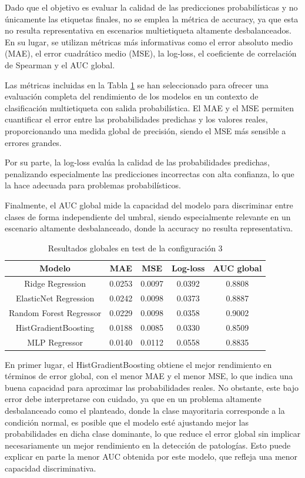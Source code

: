 \documentclass[12pt,a4paper,twoside]{book}
\begin{document}
Dado que el objetivo es evaluar la calidad de las predicciones probabilísticas y no únicamente las etiquetas finales, no se emplea la métrica de accuracy, ya que esta no resulta representativa en escenarios multietiqueta altamente desbalanceados.
En su lugar, se utilizan métricas más informativas como el error absoluto medio (MAE), el error cuadrático medio (MSE), la log-loss, el coeficiente de correlación de Spearman y el AUC global.

Las métricas incluidas en la Tabla \ref{tab:analisis-global-config3} se han seleccionado para ofrecer una evaluación completa del rendimiento de los modelos en un contexto de clasificación multietiqueta con salida probabilística. 
El MAE y el MSE permiten cuantificar el error entre las probabilidades predichas y los valores reales, proporcionando una medida global de precisión, siendo el MSE más sensible a errores grandes.

Por su parte, la log-loss evalúa la calidad de las probabilidades predichas, penalizando especialmente las predicciones incorrectas con alta confianza, lo que la hace adecuada para problemas probabilísticos.

Finalmente, el AUC global mide la capacidad del modelo para discriminar entre clases de forma independiente del umbral, siendo especialmente relevante en un escenario altamente desbalanceado, donde la accuracy no resulta representativa.

\begin{table}[H]
	\centering
	\begin{tabular}{|c|c|c|c|c|}
	\hline
	\textbf{Modelo} & \textbf{MAE} & \textbf{MSE} & \textbf{Log-loss} & \textbf{AUC global} \\
	\hline
	Ridge Regression            & 0.0253 & 0.0097 & 0.0392 & 0.8808 \\
	ElasticNet Regression       & 0.0242 & 0.0098 & 0.0373 & 0.8887 \\
	Random Forest Regressor     & 0.0229 & 0.0098 & 0.0358 & 0.9002 \\
	HistGradientBoosting        & 0.0188 & 0.0085 & 0.0330 & 0.8509 \\
	MLP Regressor               & 0.0140 & 0.0112 & 0.0558 & 0.8835 \\
	\hline
	\end{tabular}
	\caption{Resultados globales en test de la configuración 3}
	\label{tab:analisis-global-config3}
\end{table}

En primer lugar, el HistGradientBoosting obtiene el mejor rendimiento en términos de error global, con el menor MAE  y el menor MSE, lo que indica una buena capacidad para aproximar las probabilidades reales. 
No obstante, este bajo error debe interpretarse con cuidado, ya que en un problema altamente desbalanceado como el planteado, donde la clase mayoritaria corresponde a la condición normal, es posible que el modelo esté ajustando mejor las probabilidades en dicha clase dominante, lo que reduce el error global sin implicar necesariamente un mejor rendimiento en la detección de patologías. 
Esto puede explicar en parte la menor AUC obtenida por este modelo, que refleja una menor capacidad discriminativa.
\end{document}
